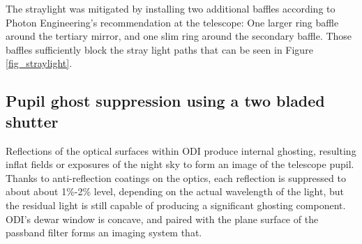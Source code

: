 \documentclass[]{spieman}
\begin{document}
The straylight was mitigated by installing two additional baffles according to Photon
Engineering's recommendation  at the telescope: One larger ring baffle around the tertiary mirror, 
and one slim ring around the secondary baffle. Those baffles sufficiently block the 
stray light paths that can be seen in Figure \ref{fig_straylight}.


\subsection{Pupil ghost suppression using a two bladed shutter}

Reflections of the optical surfaces within ODI produce
internal ghosting, resulting inflat fields or exposures of the night sky to form
an image of the telescope pupil. Thanks to anti-reflection coatings on the
optics, each reflection is suppressed to about about 1\%-2\% level, depending on
the actual wavelength of the light, but the residual light is still capable of
producing a significant ghosting component. ODI’s dewar window is concave, and
paired with the plane surface of the passband filter forms an imaging system
that.
\end{document}
